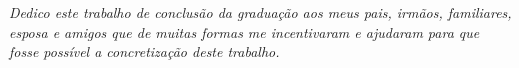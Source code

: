 \begin{dedicatoria}
   \vspace*{\fill}
   \centering
   \noindent
   \textit{Dedico este trabalho de conclusão da graduação aos meus pais, irmãos, familiares, esposa e amigos que de muitas formas me incentivaram e ajudaram para que fosse possível a concretização deste trabalho.} \vspace*{\fill}
\end{dedicatoria}
